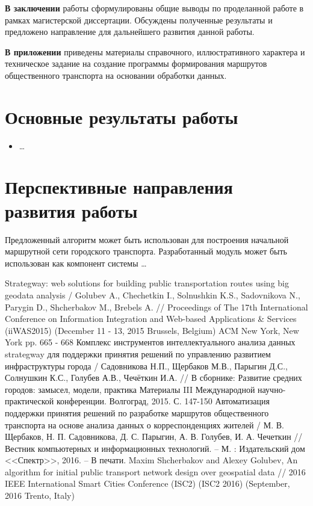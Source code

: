 \textbf{В заключении} работы сформулированы общие выводы по проделанной работе в рамках магистерской диссертации. 
Обсуждены полученные результаты и предложено направление для дальнейшего развития данной работы.

\textbf{В приложении} приведены материалы справочного, иллюстративного характера и техническое задание на 
создание программы формирования маршрутов общественного транспорта на основании обработки данных.

\section{Основные результаты работы}
\begin{itemize}
    \item \ldots
\end{itemize}

\section{Перспективные направления развития работы}
Предложенный алгоритм может быть использован для построения начальной маршрутной сети городского транспорта.
Разработанный модуль может быть использован как компонент системы \ldots

\renewcommand{\bibname}{Публикации по теме диссертации}
\begin{thebibliography}{10}
     Strategway: web solutions for building public transportation routes using big geodata 
        analysis / Golubev A., Chechetkin I., Solnushkin K.S., Sadovnikova N., Parygin D., Shcherbakov M., 
        Brebels A. // Proceedings of The 17th International Conference on Information Integration and 
        Web-based Applications \& Services (iiWAS2015) (December 11 - 13, 2015 Brussels, Belgium) 
        ACM New York, New York pp. 665 - 668
     Комплекс инструментов интеллектуального анализа данных strategway для поддержки 
        принятия решений по управлению развитием инфраструктуры города / Садовникова Н.П., Щербаков М.В., 
        Парыгин Д.С., Солнушкин К.С., Голубев А.В., Чечёткин И.А. // В сборнике: Развитие средних 
        городов: замысел, модели, практика Материалы III Международной научно-практической конференции. 
        Волгоград, 2015. С. 147-150
     Автоматизация поддержки принятия решений по разработке маршрутов общественного 
        транспорта на основе анализа данных о корреспонденциях жителей / М. В. Щербаков, 
        Н. П. Садовникова, Д. С. Парыгин, А. В. Голубев, И. А. Чечеткин // Вестник компьютерных и 
        информационных технологий. -- М. : Издательский дом <<Спектр>>, 2016. -- В печати.
     Maxim Shcherbakov and Alexey Golubev, An algorithm for initial public transport network 
        design over geospatial data // 2016 IEEE International Smart Cities Conference (ISC2) (ISC2 2016) 
        (September, 2016 Trento, Italy)
\end{thebibliography}